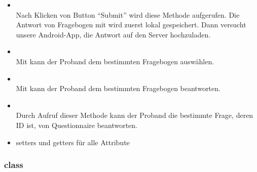 \documentclass[a4paper]{scrreprt}
\begin{document}
{\begin{enumerate}
\begin{itemize}
                                \item {\large {}}\\
                                    Nach Klicken von Button ``Submit'' wird diese Methode aufgerufen. Die Antwort von Fragebogen mit  wird zuerst lokal gespeichert. Dann versucht unsere Android-App, die Antwort auf den Server hochzuladen.
                                \item {\large {}}\\
                                    Mit  kann der Proband dem bestimmten Fragebogen auswählen. 
                                \item {\large {}}\\
                                    Mit  kann der Proband dem bestimmten Fragebogen beantworten.
                                \item {\large {}}\\
                                    Durch Aufruf dieser Methode kann der Proband die bestimmte Frage, deren ID  ist, von Questionnaire  beantworten.
                                \item {\large setters und getters für alle Attribute}
                            \end{itemize}
                    \end{enumerate}
                }



                \subsubsection{class }
\end{document}
